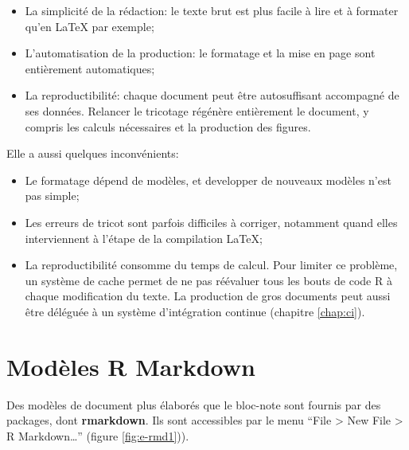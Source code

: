 \documentclass[
  11pt,
  french,
  a4paper,
  extrafontsizes,onecolumn,openright
  ]{memoir}
\providecommand{\tightlist}{%
  \setlength{\itemsep}{0pt}\setlength{\parskip}{0pt}}
\begin{document}
\begin{itemize}
\tightlist
\item
  La simplicité de la rédaction: le texte brut est plus facile à lire et à formater qu'en LaTeX par exemple;
\item
  L'automatisation de la production: le formatage et la mise en page sont entièrement automatiques;
\item
  La reproductibilité: chaque document peut être autosuffisant accompagné de ses données. Relancer le tricotage régénère entièrement le document, y compris les calculs nécessaires et la production des figures.
\end{itemize}

Elle a aussi quelques inconvénients:

\begin{itemize}
\tightlist
\item
  Le formatage dépend de modèles, et developper de nouveaux modèles n'est pas simple;
\item
  Les erreurs de tricot sont parfois difficiles à corriger, notamment quand elles interviennent à l'étape de la compilation LaTeX;
\item
  La reproductibilité consomme du temps de calcul. Pour limiter ce problème, un système de cache permet de ne pas réévaluer tous les bouts de code R à chaque modification du texte. La production de gros documents peut aussi être déléguée à un système d'intégration continue (chapitre \ref{chap:ci}).
\end{itemize}

\hypertarget{moduxe8les-r-markdown}{%
\section{Modèles R Markdown}\label{moduxe8les-r-markdown}}

Des modèles de document plus élaborés que le bloc-note sont fournis par des packages, dont \textbf{rmarkdown}.
Ils sont accessibles par le menu ``File \textgreater{} New File \textgreater{} R Markdown\ldots{}'' (figure \ref{fig:e-rmd1})).



\scriptsize
\end{document}
